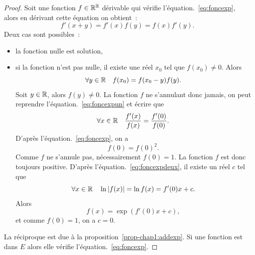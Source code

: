 \begin{proof}
  Soit une fonction $f \in \mathbb{R}^{\mathbb{R}}$ dérivable qui vérifie l'équation.~\eqref{eq:foncexp}, alors en dérivant cette équation on obtient~:
  \begin{equation}
    \label{eq:foncexpun}
    f'(x+y)=f'(x)f(y)=f(x)f'(y).
  \end{equation}
  Deux cas sont possibles~:
  \begin{itemize}
  \item la fonction nulle est solution,
  \item si la fonction n'est pas nulle, il existe une réel $x_0$ tel que $f(x_0) \neq 0$. Alors
    \begin{equation}
      \forall y \in \mathbb{R} \quad f(x_0)= f(x_0-y)f(y).
    \end{equation}
    Soit $y \in \mathbb{R}$, alors $f(y) \neq 0$. La fonction $f$ ne s'annulant donc jamais, on peut reprendre l'équation.~\ref{eq:foncexpun} et écrire que
    \begin{equation}
      \label{eq:foncexpdeux}
      \forall x \in \mathbb{R} \quad \frac{f'(x)}{f(x)}=\frac{f'(0)}{f(0)}.
    \end{equation}
    D'après l'équation.~\ref{eq:foncexp}, on a
    \begin{equation}
      f(0)=f(0)^2.
    \end{equation}
    Comme $f$ ne s'annule pas, nécessairement $f(0)=1$. La fonction $f$ est donc toujours positive. D'après l'équation.~\eqref{eq:foncexpdeux}, il existe un réel $c$ tel que
    \begin{equation}
      \forall x \in \mathbb{R} \quad \ln \left\lvert f(x)\right\rvert=\ln f(x)=f'(0) x + c.
    \end{equation}
    Alors
    \begin{equation}
      f(x)=\exp(f'(0) x +c),
    \end{equation}
    et comme $f(0)=1$, on a $c=0$.
  \end{itemize}
  La réciproque est due à la proposition~\ref{prop-chap1:addexp}. Si une fonction est dans $E$ alors elle vérifie l'équation.~\ref{eq:foncexp}.
\end{proof}
%
